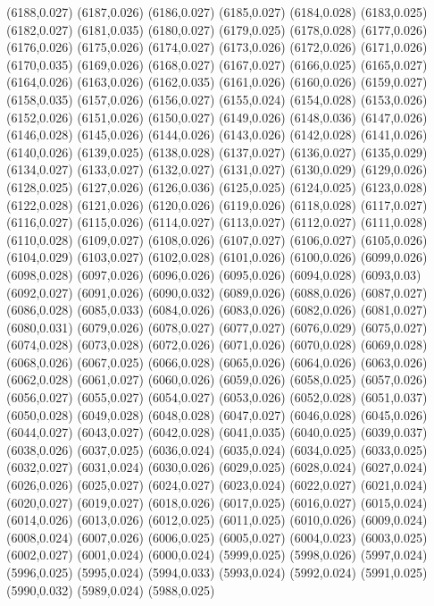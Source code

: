 (6188,0.027)
(6187,0.026)
(6186,0.027)
(6185,0.027)
(6184,0.028)
(6183,0.025)
(6182,0.027)
(6181,0.035)
(6180,0.027)
(6179,0.025)
(6178,0.028)
(6177,0.026)
(6176,0.026)
(6175,0.026)
(6174,0.027)
(6173,0.026)
(6172,0.026)
(6171,0.026)
(6170,0.035)
(6169,0.026)
(6168,0.027)
(6167,0.027)
(6166,0.025)
(6165,0.027)
(6164,0.026)
(6163,0.026)
(6162,0.035)
(6161,0.026)
(6160,0.026)
(6159,0.027)
(6158,0.035)
(6157,0.026)
(6156,0.027)
(6155,0.024)
(6154,0.028)
(6153,0.026)
(6152,0.026)
(6151,0.026)
(6150,0.027)
(6149,0.026)
(6148,0.036)
(6147,0.026)
(6146,0.028)
(6145,0.026)
(6144,0.026)
(6143,0.026)
(6142,0.028)
(6141,0.026)
(6140,0.026)
(6139,0.025)
(6138,0.028)
(6137,0.027)
(6136,0.027)
(6135,0.029)
(6134,0.027)
(6133,0.027)
(6132,0.027)
(6131,0.027)
(6130,0.029)
(6129,0.026)
(6128,0.025)
(6127,0.026)
(6126,0.036)
(6125,0.025)
(6124,0.025)
(6123,0.028)
(6122,0.028)
(6121,0.026)
(6120,0.026)
(6119,0.026)
(6118,0.028)
(6117,0.027)
(6116,0.027)
(6115,0.026)
(6114,0.027)
(6113,0.027)
(6112,0.027)
(6111,0.028)
(6110,0.028)
(6109,0.027)
(6108,0.026)
(6107,0.027)
(6106,0.027)
(6105,0.026)
(6104,0.029)
(6103,0.027)
(6102,0.028)
(6101,0.026)
(6100,0.026)
(6099,0.026)
(6098,0.028)
(6097,0.026)
(6096,0.026)
(6095,0.026)
(6094,0.028)
(6093,0.03)
(6092,0.027)
(6091,0.026)
(6090,0.032)
(6089,0.026)
(6088,0.026)
(6087,0.027)
(6086,0.028)
(6085,0.033)
(6084,0.026)
(6083,0.026)
(6082,0.026)
(6081,0.027)
(6080,0.031)
(6079,0.026)
(6078,0.027)
(6077,0.027)
(6076,0.029)
(6075,0.027)
(6074,0.028)
(6073,0.028)
(6072,0.026)
(6071,0.026)
(6070,0.028)
(6069,0.028)
(6068,0.026)
(6067,0.025)
(6066,0.028)
(6065,0.026)
(6064,0.026)
(6063,0.026)
(6062,0.028)
(6061,0.027)
(6060,0.026)
(6059,0.026)
(6058,0.025)
(6057,0.026)
(6056,0.027)
(6055,0.027)
(6054,0.027)
(6053,0.026)
(6052,0.028)
(6051,0.037)
(6050,0.028)
(6049,0.028)
(6048,0.028)
(6047,0.027)
(6046,0.028)
(6045,0.026)
(6044,0.027)
(6043,0.027)
(6042,0.028)
(6041,0.035)
(6040,0.025)
(6039,0.037)
(6038,0.026)
(6037,0.025)
(6036,0.024)
(6035,0.024)
(6034,0.025)
(6033,0.025)
(6032,0.027)
(6031,0.024)
(6030,0.026)
(6029,0.025)
(6028,0.024)
(6027,0.024)
(6026,0.026)
(6025,0.027)
(6024,0.027)
(6023,0.024)
(6022,0.027)
(6021,0.024)
(6020,0.027)
(6019,0.027)
(6018,0.026)
(6017,0.025)
(6016,0.027)
(6015,0.024)
(6014,0.026)
(6013,0.026)
(6012,0.025)
(6011,0.025)
(6010,0.026)
(6009,0.024)
(6008,0.024)
(6007,0.026)
(6006,0.025)
(6005,0.027)
(6004,0.023)
(6003,0.025)
(6002,0.027)
(6001,0.024)
(6000,0.024)
(5999,0.025)
(5998,0.026)
(5997,0.024)
(5996,0.025)
(5995,0.024)
(5994,0.033)
(5993,0.024)
(5992,0.024)
(5991,0.025)
(5990,0.032)
(5989,0.024)
(5988,0.025)
